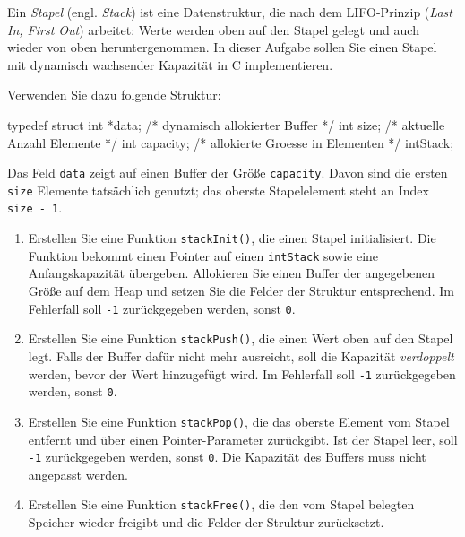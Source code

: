 Ein \textit{Stapel} (engl. \textit{Stack}) ist eine Datenstruktur, die nach dem
LIFO-Prinzip (\textit{Last In, First Out}) arbeitet: Werte werden oben auf den
Stapel gelegt und auch wieder von oben heruntergenommen. In dieser Aufgabe
sollen Sie einen Stapel mit dynamisch wachsender Kapazität in C implementieren.

Verwenden Sie dazu folgende Struktur:
\begin{codebox}[lang=c, fontsize=\small]
typedef struct {
    int *data;       /* dynamisch allokierter Buffer */
    int  size;       /* aktuelle Anzahl Elemente */
    int  capacity;   /* allokierte Groesse in Elementen */
} intStack;
\end{codebox}

Das Feld \texttt{data} zeigt auf einen Buffer der Größe
\texttt{capacity}. Davon sind die ersten \texttt{size} Elemente
tatsächlich genutzt; das oberste Stapelelement steht an Index
\texttt{size - 1}.

\begin{enumerate}

\item Erstellen Sie eine Funktion \texttt{stackInit()}, die einen Stapel
initialisiert. Die Funktion bekommt einen Pointer auf einen
\texttt{intStack} sowie eine Anfangskapazität übergeben. Allokieren Sie
einen Buffer der angegebenen Größe auf dem Heap und setzen Sie die Felder der
Struktur entsprechend. Im Fehlerfall soll \texttt{-1} zurückgegeben
werden, sonst \texttt{0}.

\item Erstellen Sie eine Funktion \texttt{stackPush()}, die einen Wert
oben auf den Stapel legt. Falls der Buffer dafür nicht mehr ausreicht, soll die
Kapazität \textit{verdoppelt} werden, bevor der Wert hinzugefügt wird. Im
Fehlerfall soll \texttt{-1} zurückgegeben werden, sonst
\texttt{0}.

\item Erstellen Sie eine Funktion \texttt{stackPop()}, die das oberste
Element vom Stapel entfernt und über einen Pointer-Parameter zurückgibt. Ist der
Stapel leer, soll \texttt{-1} zurückgegeben werden, sonst
\texttt{0}. Die Kapazität des Buffers muss nicht angepasst werden.

\item Erstellen Sie eine Funktion \texttt{stackFree()}, die den vom
Stapel belegten Speicher wieder freigibt und die Felder der Struktur
zurücksetzt.

\end{enumerate}

